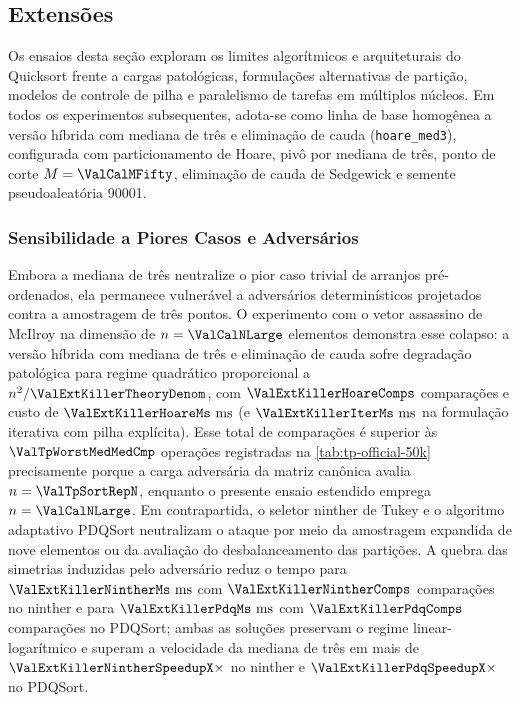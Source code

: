 \documentclass[12pt]{article}
\begin{document}
\subsection{Extensões}\label{sec:res-extensoes}

Os ensaios desta seção exploram os limites algorítmicos e arquiteturais do Quicksort frente a cargas patológicas, formulações alternativas de partição, modelos de controle de pilha e paralelismo de tarefas em múltiplos núcleos. Em todos os experimentos subsequentes, adota-se como linha de base homogênea a versão híbrida com mediana de três e eliminação de cauda (\texttt{hoare\_med3}), configurada com particionamento de Hoare, pivô por mediana de três, ponto de corte $M = \ValCalMFifty$, eliminação de cauda de Sedgewick e semente pseudoaleatória 90001.

\subsubsection{Sensibilidade a Piores Casos e Adversários}\label{sec:res-worst-case}

Embora a mediana de três neutralize o pior caso trivial de arranjos pré-ordenados, ela permanece vulnerável a adversários determinísticos projetados contra a amostragem de três pontos. O experimento com o vetor assassino de McIlroy na dimensão de $n = \ValCalNLarge$ elementos demonstra esse colapso: a versão híbrida com mediana de três e eliminação de cauda sofre degradação patológica para regime quadrático proporcional a $n^2/\ValExtKillerTheoryDenom$, com $\ValExtKillerHoareComps$ comparações e custo de $\ValExtKillerHoareMs\text{ ms}$ (e $\ValExtKillerIterMs\text{ ms}$ na formulação iterativa com pilha explícita). Esse total de comparações é superior às $\ValTpWorstMedMedCmp$ operações registradas na \cref{tab:tp-official-50k} precisamente porque a carga adversária da matriz canônica avalia $n = \ValTpSortRepN$, enquanto o presente ensaio estendido emprega $n = \ValCalNLarge$. Em contrapartida, o seletor ninther de Tukey e o algoritmo adaptativo PDQSort neutralizam o ataque por meio da amostragem expandida de nove elementos ou da avaliação do desbalanceamento das partições. A quebra das simetrias induzidas pelo adversário reduz o tempo para $\ValExtKillerNintherMs\text{ ms}$ com $\ValExtKillerNintherComps$ comparações no ninther e para $\ValExtKillerPdqMs\text{ ms}$ com $\ValExtKillerPdqComps$ comparações no PDQSort; ambas as soluções preservam o regime linear-logarítmico e superam a velocidade da mediana de três em mais de $\ValExtKillerNintherSpeedupX\times$ no ninther e $\ValExtKillerPdqSpeedupX\times$ no PDQSort.
\end{document}
